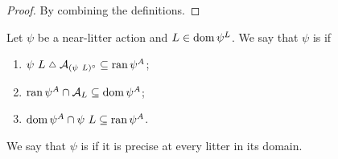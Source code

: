 \begin{proof}
    By combining the definitions.
\end{proof}
\begin{definition}
    Let \( \psi \) be a near-litter action and \( L \in \operatorname{dom} \psi^L \).
    We say that \( \psi \) is  if
    \begin{enumerate}
        \item \( \psi\ L \symmdiff \mathcal A_{(\psi\ L)^\circ} \subseteq \ran \psi^A \);
        \item \( \operatorname{ran} \psi^A \cap \mathcal A_L \subseteq \operatorname{dom} \psi^A \);
        \item \( \operatorname{dom} \psi^A \cap \psi\ L \subseteq \operatorname{ran} \psi^A \).
    \end{enumerate}
    We say that \( \psi \) is  if it is precise at every litter in its domain.
\end{definition}
